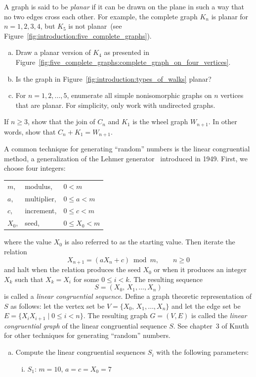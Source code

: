 \begin{problem}
\item A graph is said to be \emph{planar} if it can be drawn on the
  plane in such a way that no two edges cross each other. For example,
  the complete graph $K_n$ is planar for $n = 1, 2, 3, 4$, but $K_5$
  is not planar~(see
  Figure~\ref{fig:introduction:five_complete_graphs}).
  \begin{enumerate}[(a)]
  \item Draw a planar version of $K_4$ as presented in
    Figure~\ref{fig:five_complete_graphs:complete_graph_on_four_vertices}.

  \item Is the graph in Figure~\ref{fig:introduction:types_of_walks}
    planar?

  \item For $n = 1, 2, \dots, 5$, enumerate all simple nonisomorphic
    graphs on $n$ vertices that are planar. For simplicity, only work
    with undirected graphs.
  \end{enumerate}

\item If $n \geq 3$, show that the join of $C_n$ and $K_1$ is the
  wheel graph $W_{n+1}$. In other words, show that $C_n + K_1 = W_{n+1}$.

\item A common technique for generating ``random'' numbers is the
  linear congruential method, a generalization of the Lehmer
  generator~\cite{Lehmer1949} introduced in 1949. First, we choose
  four integers:
  \begin{center}
  \begin{tabular}{lll}
  $m$,   & modulus,    & $0 < m$ \\[4pt]
  $a$,   & multiplier, & $0 \leq a < m$ \\[4pt]
  $c$,   & increment,  & $0 \leq c < m$ \\[4pt]
  $X_0$, & seed,       & $0 \leq X_0 < m$
  \end{tabular}
  \end{center}
  where the value $X_0$ is also referred to as the starting
  value. Then iterate the relation
  \[
  X_{n+1}
  =
  (a X_n + c) \bmod m,\qquad n \geq 0
  \]
  and halt when the relation produces the seed $X_0$ or when it
  produces an integer $X_k$ such that $X_k = X_i$ for some
  $0 \leq i < k$. The resulting sequence
  \[
  S
  =
  (X_0,\, X_1, \dots, X_n)
  \]
  is called a \emph{linear congruential sequence}. Define a graph
  theoretic representation of $S$ as follows: let the vertex set be
  $V = \{X_0,\, X_1, \dots, X_n\}$ and let the edge set be
  $E = \{X_i X_{i+1} \mid 0 \leq i < n\}$. The resulting graph
  $G = (V,E)$ is called the \emph{linear congruential graph} of the
  linear congruential sequence $S$. See chapter~3 of
  Knuth~\cite{Knuth1998b} for other techniques for generating
  ``random'' numbers.
  \begin{enumerate}[(a)]
  \item Compute the linear congruential sequences $S_i$ with the
    following parameters:
    \begin{enumerate}[(i)]
    \item $S_1$: $m = 10$, $a = c = X_0 = 7$


\end{enumerate}
\end{enumerate}
\end{problem}
